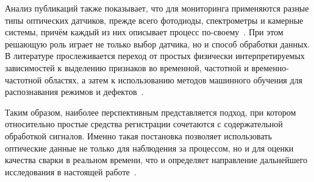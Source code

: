 Анализ публикаций также показывает, что для мониторинга применяются разные типы оптических датчиков, прежде всего фотодиоды, спектрометры и камерные системы, причём каждый из них описывает процесс по-своему~\cite{wu2022progress,huang2025laser,zhang2019low,you2014review}. При этом решающую роль играет не только выбор датчика, но и способ обработки данных. В литературе прослеживается переход от простых физически интерпретируемых зависимостей к выделению признаков во временной, частотной и временно-частотной областях, а затем к использованию методов машинного обучения для распознавания режимов и дефектов~\cite{mrvna2013correlation,park2001fuzzy,olsson2011advances,cao2023cross}.

Таким образом, наиболее перспективным представляется подход, при котором относительно простые средства регистрации сочетаются с содержательной обработкой сигналов. Именно такая постановка позволяет использовать оптические данные не только для наблюдения за процессом, но и для оценки качества сварки в реальном времени, что и определяет направление дальнейшего исследования в настоящей работе~\cite{wu2022progress,huang2025laser}.


\endinput